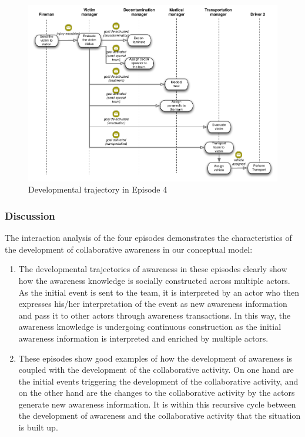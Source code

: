 \begin{figure}[htbp] %
   \centering
   \includegraphics[width=5.8in]{episode_4_interaction.pdf} 
   \caption{Developmental trajectory in Episode 4}
   \label{fig:episode_4_interaction}
\end{figure}
\subsubsection{Discussion} %
\label{ssub:discussion}
The interaction analysis of the four episodes demonstrates the characteristics of the development of collaborative awareness in our conceptual model:

\begin{enumerate}
	\item The developmental trajectories of awareness in these episodes clearly show how the awareness knowledge is socially constructed across multiple actors. As the initial event is sent to the team, it is interpreted by an actor who then expresses his/her interpretation of the event as new awareness information and pass it to other actors through awareness transactions. In this way, the awareness knowledge is undergoing continuous construction as the initial awareness information is interpreted and enriched by multiple actors.
	\item These episodes show good examples of how the development of awareness is coupled with the development of the collaborative activity. On one hand are the initial events triggering the development of the collaborative activity, and on the other hand are the changes to the collaborative activity by the actors generate new awareness information. It is within this recursive cycle between the development of awareness and the collaborative activity that the situation is built up.
\end{enumerate}

